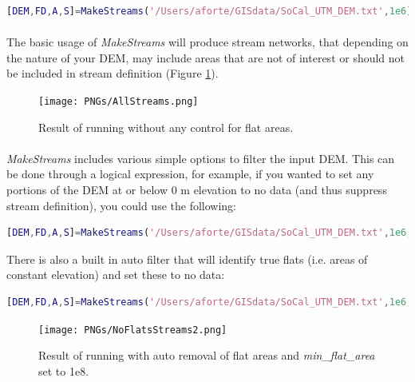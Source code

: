\begin{lstlisting}[language=Matlab]
[DEM,FD,A,S]=MakeStreams('/Users/aforte/GISdata/SoCal_UTM_DEM.txt',1e6);
\end{lstlisting}

\paragraph{}The basic usage of \textit{MakeStreams} will produce stream networks, that depending on the nature of your DEM, may include areas that are not of interest or should not be included in stream definition (Figure \ref{fig:AllStreams}).

\begin{figure}[H]
	\texttt{[image: PNGs/AllStreams.png]}
	\caption{Result of running  without any control for flat areas.}
	\label{fig:AllStreams}
\end{figure}

\paragraph{}\textit{MakeStreams} includes various simple options to filter the input DEM. This can be done through a logical expression, for example, if you wanted to set any portions of the DEM at or below 0 m elevation to no data (and thus suppress stream definition), you could use the following:

\begin{lstlisting}[language=Matlab]
[DEM,FD,A,S]=MakeStreams('/Users/aforte/GISdata/SoCal_UTM_DEM.txt',1e6,'no_data_exp','DEM<=0');
\end{lstlisting}

\noindent
There is also a built in auto filter that will identify true flats (i.e. areas of constant elevation) and set these to no data:

\begin{lstlisting}[language=Matlab]
[DEM,FD,A,S]=MakeStreams('/Users/aforte/GISdata/SoCal_UTM_DEM.txt',1e6,'no_data_exp','auto');
\end{lstlisting}



\begin{figure}[H]
	\texttt{[image: PNGs/NoFlatsStreams2.png]}
	\caption{Result of running  with auto removal of flat areas and \textit{min\_flat\_area} set to 1e8.}
	\label{fig:NoFlatsStreams}
\end{figure}

